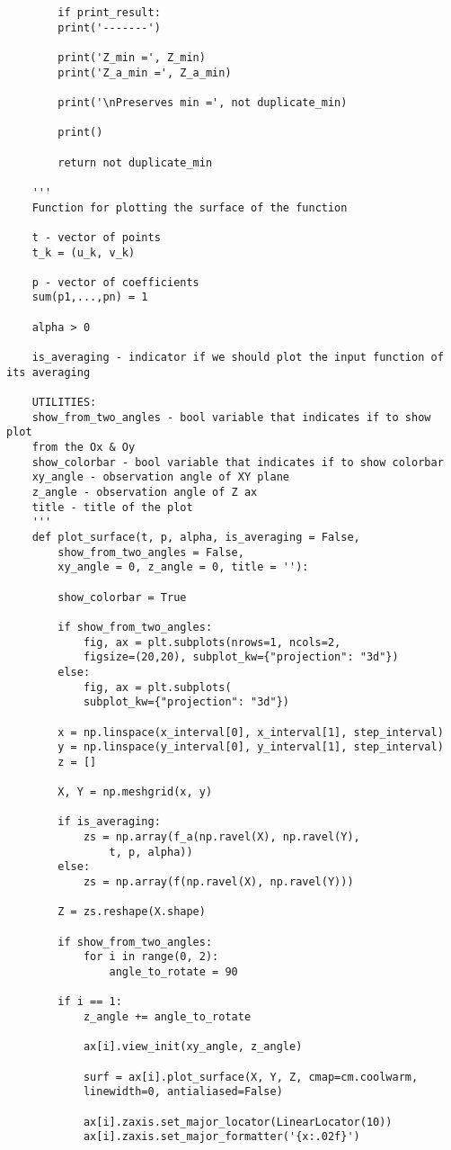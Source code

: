 \documentclass[12pt]{article}
\begin{document}
\begin{verbatim}
		if print_result:
		print('-------')
		
		print('Z_min =', Z_min)
		print('Z_a_min =', Z_a_min)
		
		print('\nPreserves min =', not duplicate_min)
		
		print()
		
		return not duplicate_min
	
	'''
	Function for plotting the surface of the function
	
	t - vector of points
	t_k = (u_k, v_k)
	
	p - vector of coefficients
	sum(p1,...,pn) = 1
	
	alpha > 0
	
	is_averaging - indicator if we should plot the input function of its averaging
	
	UTILITIES:
	show_from_two_angles - bool variable that indicates if to show plot
	from the Ox & Oy 
	show_colorbar - bool variable that indicates if to show colorbar
	xy_angle - observation angle of XY plane
	z_angle - observation angle of Z ax
	title - title of the plot
	'''
	def plot_surface(t, p, alpha, is_averaging = False, 
		show_from_two_angles = False,
		xy_angle = 0, z_angle = 0, title = ''):
		
		show_colorbar = True
		
		if show_from_two_angles:
			fig, ax = plt.subplots(nrows=1, ncols=2, 
			figsize=(20,20), subplot_kw={"projection": "3d"})
		else:
			fig, ax = plt.subplots(
			subplot_kw={"projection": "3d"})
		
		x = np.linspace(x_interval[0], x_interval[1], step_interval)
		y = np.linspace(y_interval[0], y_interval[1], step_interval)
		z = []
		
		X, Y = np.meshgrid(x, y)
		
		if is_averaging:
			zs = np.array(f_a(np.ravel(X), np.ravel(Y), 
				t, p, alpha))
		else:
			zs = np.array(f(np.ravel(X), np.ravel(Y)))
		
		Z = zs.reshape(X.shape)
		
		if show_from_two_angles:
			for i in range(0, 2):
				angle_to_rotate = 90
		
		if i == 1:
			z_angle += angle_to_rotate
		
			ax[i].view_init(xy_angle, z_angle)
			
			surf = ax[i].plot_surface(X, Y, Z, cmap=cm.coolwarm,
			linewidth=0, antialiased=False)
			
			ax[i].zaxis.set_major_locator(LinearLocator(10))
			ax[i].zaxis.set_major_formatter('{x:.02f}')
			

\end{verbatim}
\end{document}
